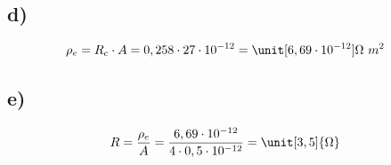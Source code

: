 \subsection*{d)}

\begin{align*}
\rho_e &= R_c \cdot A = 0,258 \cdot 27 \cdot 10^{-12} = \unit[6,69 \cdot 10^{-12}]{\Omega \ m^2}
\end{align*}


\subsection*{e)}

\begin{align*}
R &= \frac{\rho_e}{A} = \frac{6,69 \cdot 10^{-12}}{4 \cdot 0,5 \cdot 10^{-12}} = \unit[3,5]{\Omega}
\end{align*}





























